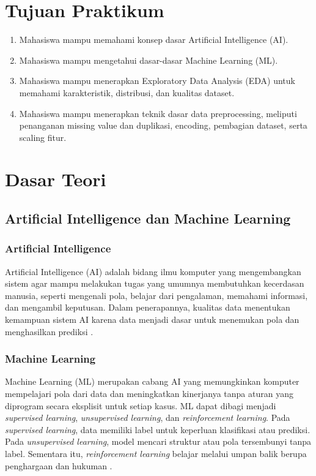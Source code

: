 \documentclass[a4paper,oneside,12pt]{report}
\begin{document}
\setcounter{page}{3}

\chapter[Tujuan Praktikum]{Tujuan Praktikum}
\begin{enumerate}
   \item Mahasiswa mampu memahami konsep dasar Artificial Intelligence (AI).
   \item Mahasiswa mampu mengetahui dasar-dasar Machine Learning (ML).
   \item Mahasiswa mampu menerapkan Exploratory Data Analysis (EDA) untuk memahami karakteristik, distribusi, dan kualitas dataset.
   \item Mahasiswa mampu menerapkan teknik dasar data preprocessing, meliputi penanganan missing value dan duplikasi, encoding, pembagian dataset, serta scaling fitur.
\end{enumerate}
\clearpage

\chapter{Dasar Teori}

\section{Artificial Intelligence dan Machine Learning}

\subsection{Artificial Intelligence}
Artificial Intelligence (AI) adalah bidang ilmu komputer yang mengembangkan sistem
agar mampu melakukan tugas yang umumnya membutuhkan kecerdasan manusia, seperti
mengenali pola, belajar dari pengalaman, memahami informasi, dan mengambil
keputusan. Dalam penerapannya, kualitas data menentukan kemampuan sistem
AI karena data menjadi dasar untuk menemukan pola dan menghasilkan prediksi
\cite{dicoding-workflow}.

\subsection{Machine Learning}
Machine Learning (ML) merupakan cabang AI yang memungkinkan komputer mempelajari
pola dari data dan meningkatkan kinerjanya tanpa aturan yang diprogram secara
eksplisit untuk setiap kasus. ML dapat dibagi menjadi \textit{supervised learning},
\textit{unsupervised learning}, dan \textit{reinforcement learning}. Pada
\textit{supervised learning}, data memiliki label untuk keperluan klasifikasi atau
prediksi. Pada \textit{unsupervised learning}, model mencari struktur atau pola
tersembunyi tanpa label. Sementara itu, \textit{reinforcement learning} belajar
melalui umpan balik berupa penghargaan dan hukuman
\cite{google-ml-categorical}.
\end{document}
